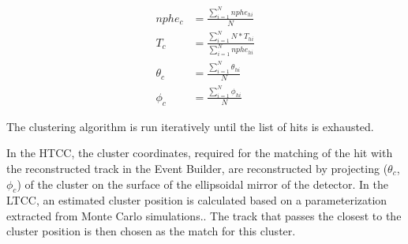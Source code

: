 \begin{eqnarray*}
nphe_c &= \frac{\sum_{i=1}^{N}{nphe_{hi}}}{N}\\
T_c &= \frac{\sum_{i=1}^{N}{N*T_{hi}}}{\sum_{i=1}^{N}{nphe_{hi}}}\\
\theta_c &=\frac{\sum_{i=1}^{N}{\theta_{hi}}}{N}\\
\phi_c &= \frac{\sum_{i=1}^{N}{\phi_{hi}}}{N}
\end{eqnarray*}

The clustering algorithm is run iteratively until the list of hits is
exhausted.

In the HTCC, the cluster coordinates, required for the matching of the hit with the reconstructed track in the Event Builder, are
reconstructed by projecting  ($\theta_c$, $\phi_c$) of the cluster on the surface of the ellipsoidal mirror of the detector. In the LTCC, an estimated cluster position is calculated based on a parameterization extracted from Monte Carlo simulations..  The track that passes the closest to the cluster position is then chosen as the match for this cluster.
